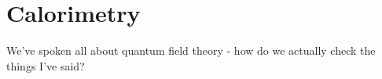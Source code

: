 \documentclass[main.tex]{subfiles}
\begin{document}
\chapter{Calorimetry}
We've spoken all about quantum field theory - how do we actually check the things I've said?
\end{document}
